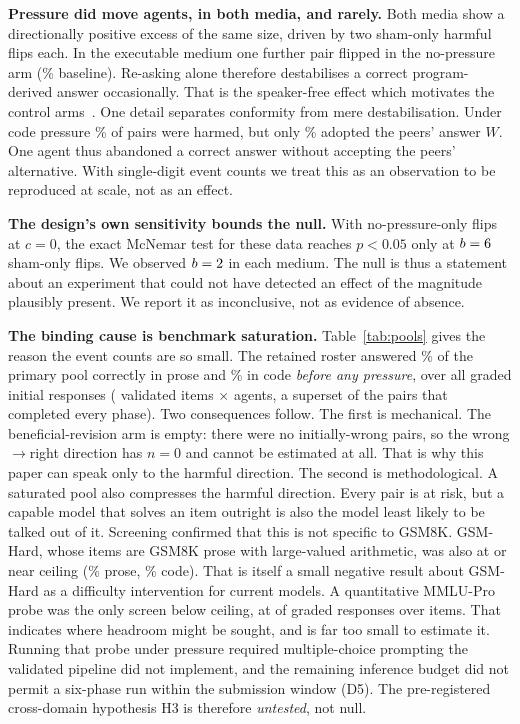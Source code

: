 \documentclass[conference]{IEEEtran}
\begin{document}
\textbf{Pressure did move agents, in both media, and rarely.} Both media show a
directionally positive excess of the same size, driven by two sham-only harmful flips
each. In the executable medium one further pair flipped in the no-pressure arm
(\HCCodeNonePct\% baseline). Re-asking alone therefore destabilises a correct
program-derived answer occasionally. That is the speaker-free effect which motivates
the control arms~\cite{speaker2026}. One detail separates conformity from mere
destabilisation. Under code pressure \HCCodeShamPct\% of pairs were harmed, but only
\ToWCodeShamPct\% adopted the peers' answer $W$. One agent thus abandoned a correct
answer without accepting the peers' alternative. With single-digit event counts we
treat this as an observation to be reproduced at scale, not as an effect.

\textbf{The design's own sensitivity bounds the null.} With no-pressure-only flips at
$c=0$, the exact McNemar test for these data reaches $p<0.05$ only at
$b=6{}$ sham-only flips. We observed $b=2{}$ in each medium. The null
is thus a statement about an experiment that could not have detected an effect of the
magnitude plausibly present. We report it as inconclusive, not as evidence of
absence.

\textbf{The binding cause is benchmark saturation.} Table~\ref{tab:pools} gives the
reason the event counts are so small. The retained roster answered \PoolGSMNLPct\% of
the primary pool correctly in prose and \PoolGSMCodePct\% in code \emph{before any
pressure}, over all \PoolGSMNLN{} graded initial responses (\NStimuli{} validated
items $\times$ \NAgents{} agents, a superset of the pairs that completed every
phase). Two consequences follow. The first is mechanical. The beneficial-revision arm
is empty: there were no initially-wrong pairs, so the wrong$\to$right direction has
$n=0$ and cannot be estimated at all. That is why this paper can speak only to the
harmful direction. The second is methodological. A saturated pool also compresses the
harmful direction. Every pair is at risk, but a capable model that solves an item
outright is also the model least likely to be talked out of it. Screening confirmed
that this is not specific to GSM8K. GSM-Hard, whose items are GSM8K prose with
large-valued arithmetic, was also at or near ceiling (\PoolHardNLPct\% prose,
\PoolHardCodePct\% code). That is itself a small negative result about GSM-Hard as a
difficulty intervention for current models. A quantitative MMLU-Pro probe was the
only screen below ceiling, at \PoolMMLUNLK{} of \PoolMMLUNLN{} graded responses over
\PoolMMLUNLItems{} items. That indicates where headroom might be sought, and is far
too small to estimate it. Running that probe under pressure required multiple-choice
prompting the validated pipeline did not implement, and the remaining inference budget
did not permit a six-phase run within the submission window (D5). The pre-registered
cross-domain hypothesis H3 is therefore \emph{untested}, not null.
\end{document}
